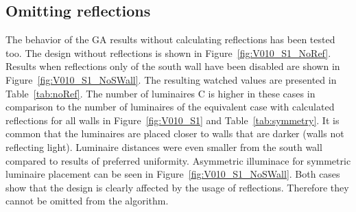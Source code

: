 \subsection{Omitting reflections}

The behavior of the GA results without calculating reflections has been tested too. The design without reflections is shown in Figure~\ref{fig:V010_S1_NoRef}. Results when reflections only of the south wall have been disabled are shown in Figure~\ref{fig:V010_S1_NoSWall}. The resulting watched values are presented in Table~\ref{tab:noRef}. The number of luminaires C is higher in these cases in comparison to the number of luminaires of the equivalent case with calculated reflections for all walls in Figure~\ref{fig:V010_S1} and Table~\ref{tab:symmetry}. It is common that the luminaires are placed closer to walls that are darker (walls not reflecting light). Luminaire distances were even smaller from the south wall compared to results of preferred uniformity. Asymmetric illuminace for symmetric luminaire placement can be seen in Figure~\ref{fig:V010_S1_NoSWall}. Both cases show that the design is clearly affected by the usage of reflections. Therefore they cannot be omitted from the algorithm.

